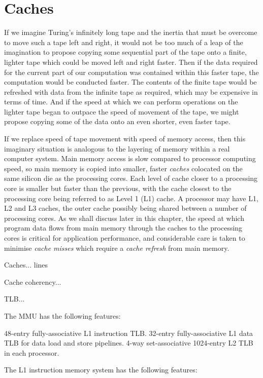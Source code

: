 \documentclass{report}
\begin{document}
%
%
\section{Caches}

If we imagine Turing's infinitely long tape and the inertia that must be overcome to move such a tape left and right, it would not be too much of a leap of the imagination to propose copying some sequential part of the tape onto a finite, lighter tape which could be moved left and right faster. Then if the data required for the current part of our computation was contained within this faster tape, the computation would be conducted faster. The contents of the finite tape would be refreshed with data from the infinite tape as required, which may be expensive in terms of time. And if the speed at which we can perform operations on the lighter tape began to outpace the speed of movement of the tape, we might propose copying some of the data onto an even shorter, even faster tape.

If we replace speed of tape movement with speed of memory access, then this imaginary situation is analogous to the layering of memory within a real computer system. Main memory access is slow compared to processor computing speed, so main memory is copied into smaller, faster \emph{caches} colocated on the same silicon die as the processing cores. Each level of cache closer to a processing core is smaller but faster than the previous, with the cache closest to the processing core being referred to as Level 1 (L1) cache. A processor may have L1, L2 and L3 caches, the outer cache possibly being shared between a number of processing cores. As we shall discuss later in this chapter, the speed at which program data flows from main memory through the caches to the processing cores is critical for application performance, and considerable care is taken to minimise \emph{cache misses} which require a \emph{cache refresh} from main memory.

Caches... lines

Cache coherency...

TLB...

The MMU has the following features:

48-entry fully-associative L1 instruction TLB.
32-entry fully-associative L1 data TLB for data load and store pipelines.
4-way set-associative 1024-entry L2 TLB in each processor.

The L1 instruction memory system has the following features:
\end{document}
